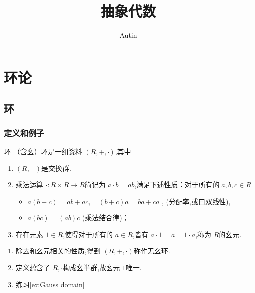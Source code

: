 \documentclass[lang=cn,12pt,color=green,fontset=none,pad]{elegantbook}
\title{抽象代数}
\author{Autin}
\begin{document}
\maketitle


\frontmatter


\tableofcontents

\mainmatter

\part{环论}

\chapter{环}

\section{定义和例子}
\begin{definition}{环}
    （含幺）环是一组资料 \(  \left( R,+ ,\cdot  \right)   \),其中 \begin{enumerate}
        \item \(  \left( R,+  \right)   \)是交换群.
        \item 乘法运算 \(  \cdot : R\times R \to R  \)简记为 \(  a\cdot b= ab  \),满足下述性质：对于所有的 \(  a,b,c\in R  \) 
        \begin{itemize}
            \item \(  a\left( b+ c \right)= ab+ ac,\quad \left( b+ c \right)a =  ba+ ca    \) ,  (分配率,或曰双线性),
            \item \(  a\left( bc \right)= \left( ab \right)c    \)  (乘法结合律)；    
        \end{itemize}
        \item 存在元素 \(  1\in R  \),使得对于所有的 \(  a \in R  \),皆有 \(  a\cdot 1= a=  1\cdot a  \),称为 \(  R  \)的幺元. 
            
    \end{enumerate}
     
\end{definition}

\begin{remark}
    \begin{enumerate}
        \item 除去和幺元相关的性质,得到 \(  \left( R,+ ,\cdot  \right)   \)称作无幺环.
        \item 定义蕴含了 \(  R,\cdot   \)构成幺半群,故幺元 \(  1  \)唯一.  
        \item 练习\ref{ex:Gauss domain}
    \end{enumerate}
     
\end{remark}
\end{document}
